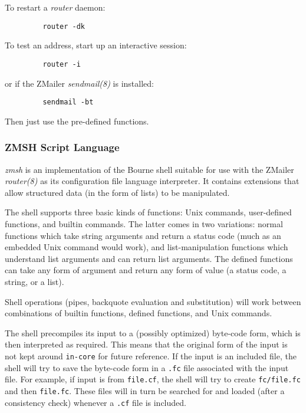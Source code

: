 To restart a {\em router\/} daemon: 
\begin{verbatim}
         router -dk
\end{verbatim}


To test an address, start up an interactive session: 
\begin{verbatim}
         router -i
\end{verbatim}


or if the ZMailer {\em sendmail(8)\/} is installed: 
\begin{verbatim}
         sendmail -bt
\end{verbatim}


Then just use the pre-defined functions.




\subsubsection{ZMSH Script Language}



{\em zmsh\/} is an implementation of the Bourne shell 
suitable for use with the ZMailer {\em router(8)\/} as 
its configuration file language interpreter. It contains 
extensions that allow structured data (in the form of lists) 
to be manipulated. 

The shell supports three basic kinds of functions: Unix 
commands, user-defined functions, and builtin commands. 
The latter comes in two variations: normal functions which 
take string arguments and return a status code (much as an 
embedded Unix command would work), and list-manipulation 
functions which understand list arguments and can return 
list arguments. The defined functions can take any form 
of argument and return any form of value (a status code, 
a string, or a list). 

Shell operations (pipes, backquote evaluation and substitution) 
will work between combinations of builtin functions, 
defined functions, and Unix commands.

The shell precompiles its input to a (possibly optimized) 
byte-code form, which is then interpreted as required. 
This means that the original form of the input is not kept 
around {\tt in-core} for future reference. If the input 
is an included file, the shell will try to save the byte-code 
form in a {\tt .fc} file associated with the input file. 
For example, if input is from {\tt file.cf}, the shell 
will try to create {\tt fc/file.fc} and then {\tt file.fc}. 
These files will in turn be searched for and loaded 
(after a consistency check) whenever a {\tt .cf} file is included. 

